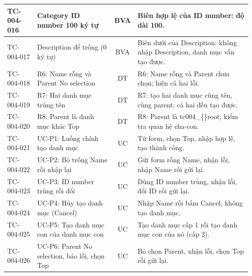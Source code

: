 {\begin{longtable}{|l|L{4.4cm}|c|L{6.4cm}|}
TC-004-016 & Category ID number 100 ký tự & BVA & Biên hợp lệ của ID number: độ dài 100. \\ \hline
TC-004-017 & Description để trống (0 ký tự) & BVA & Biên dưới của Description: không nhập Description, danh mục vẫn tạo được. \\ \hline
TC-004-018 & R6: Name rỗng và Parent No selection & DT & R6: Name rỗng và Parent chưa chọn; hiện cả hai lỗi. \\ \hline
TC-004-019 & R7: Hai danh mục trùng tên & DT & R7: tạo hai danh mục cùng tên, cùng parent; cả hai đều tạo được. \\ \hline
TC-004-020 & R8: Parent là danh mục khác Top & DT & R8: Parent là tc004\_\allowbreak\{\}root; kiểm tra quan hệ cha-con. \\ \hline
TC-004-021 & UC-P1: Luồng chính tạo danh mục & UC & Từ form, chọn Top, nhập hợp lệ, tạo thành công. \\ \hline
TC-004-022 & UC-P2: Bỏ trống Name rồi nhập lại & UC & Gửi form rỗng Name, nhận lỗi, nhập Name rồi gửi lại. \\ \hline
TC-004-023 & UC-P3: ID number trùng rồi đổi & UC & Dùng ID number trùng, nhận lỗi, đổi ID rồi gửi lại. \\ \hline
TC-004-024 & UC-P4: Hủy tạo danh mục (Cancel) & UC & Nhập Name rồi bấm Cancel; không tạo danh mục. \\ \hline
TC-004-025 & UC-P5: Tạo danh mục con của danh mục con & UC & Tạo danh mục cấp 1 rồi tạo danh mục con của nó (cấp 2). \\ \hline
TC-004-026 & UC-P6: Parent No selection, báo lỗi, chọn Top & UC & Bỏ chọn Parent, nhận lỗi, chọn Top rồi gửi lại. \\ \hline
\end{longtable}
}
